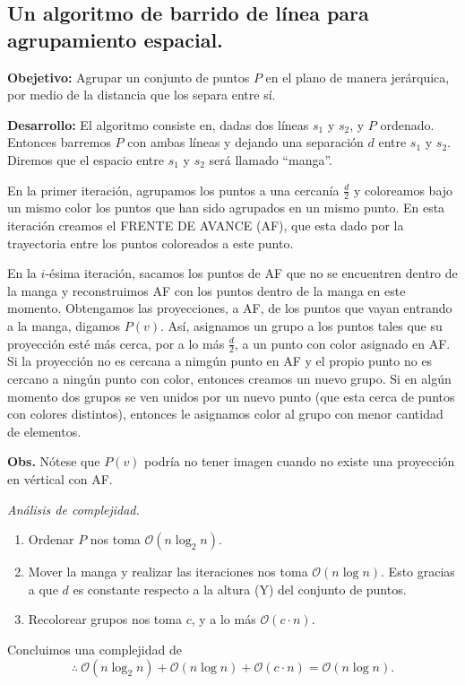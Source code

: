 \subsection[Expositor: Adrián Aguilera.]{Un algoritmo de barrido de línea para agrupamiento espacial.}
\textbf{Obejetivo:} Agrupar un conjunto de puntos $P$ en el plano de manera
jerárquica, por medio de la distancia que los separa entre sí. \newline

\textbf{Desarrollo:} El algoritmo consiste en, dadas dos líneas
$s_1$ y $s_2$, y $P$ ordenado. Entonces barremos $P$ con ambas
líneas y dejando una separación $d$ entre $s_1$ y $s_2$. Diremos que
el espacio entre $s_1$ y $s_2$ será llamado ``manga''.\newline

En la primer iteración, agrupamos los puntos a una cercanía $\frac{d}{2}$ y coloreamos
bajo un mismo color los puntos que han sido agrupados en un mismo punto. En esta iteración
creamos el FRENTE DE AVANCE (AF), que esta dado por la trayectoria entre los puntos
coloreados a este punto. \newline

En la $i$-ésima iteración, sacamos los puntos de AF que no se encuentren dentro de la manga
y reconstruimos AF con los puntos dentro de la manga en este momento. Obtengamos las proyecciones, a AF,
de los puntos que vayan entrando a la manga, digamos $P(v)$. Así, asignamos un grupo a los puntos
tales que su proyección esté más cerca, por a lo más $\frac{d}{2}$,  a un punto con color asignado en AF.
Si la proyección no es cercana a nimgún punto en AF y el propio punto no es cercano a ningún punto con color,
entonces creamos un nuevo grupo. Si en algún momento dos grupos se ven unidos por un nuevo punto (que esta
cerca de puntos con colores distintos), entonces le asignamos color al grupo con menor cantidad de elementos.

\textbf{Obs.} Nótese que $P(v)$ podría no tener imagen cuando no existe una proyección en vértical con AF.
\newline

\textit{Análisis de complejidad.}
\begin{enumerate}
\item Ordenar $P$ nos toma $\mathcal{O}(n \log_2 n)$.
\item Mover la manga y realizar las iteraciones nos toma $\mathcal{O}(n \log n)$. Esto gracias a que $d$ es constante
  respecto a la altura (Y) del conjunto de puntos.
\item Recolorear grupos nos toma $c$, y a lo más $\mathcal{O}(c\cdot n)$.
\end{enumerate}
Concluimos una complejidad de
\[\therefore\: \mathcal{O}(n \log_2 n) + \mathcal{O}(n \log n) + \mathcal{O}(c\cdot n) = \mathcal{O}(n \log n).\]
